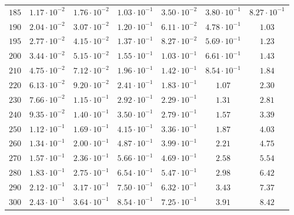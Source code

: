 \begin{table}[h]
\begin{tabular}{lcccccc}
$	185	$ & $	1.17 \cdot 10^{-2} 	$ & $	1.76 \cdot 10^{-2} 	$ & $	1.03 \cdot 10^{-1} 	$ & $	3.50 \cdot 10^{-2} 	$ & $	3.80 \cdot 10^{-1} 	$ & $	8.27 \cdot 10^{-1} 	 $ \\
$	190	$ & $	2.04 \cdot 10^{-2} 	$ & $	3.07 \cdot 10^{-2} 	$ & $	1.20 \cdot 10^{-1} 	$ & $	6.11 \cdot 10^{-2} 	$ & $	4.78 \cdot 10^{-1} 	$ & $	1.03 	 $ \\
$	195	$ & $	2.77 \cdot 10^{-2} 	$ & $	4.15 \cdot 10^{-2} 	$ & $	1.37 \cdot 10^{-1} 	$ & $	8.27 \cdot 10^{-2} 	$ & $	5.69 \cdot 10^{-1} 	$ & $	1.23 	 $ \\
$	200	$ & $	3.44 \cdot 10^{-2} 	$ & $	5.15 \cdot 10^{-2} 	$ & $	1.55 \cdot 10^{-1} 	$ & $	1.03 \cdot 10^{-1} 	$ & $	6.61 \cdot 10^{-1} 	$ & $	1.43 	 $ \\
$	210	$ & $	4.75 \cdot 10^{-2} 	$ & $	7.12 \cdot 10^{-2} 	$ & $	1.96 \cdot 10^{-1} 	$ & $	1.42 \cdot 10^{-1} 	$ & $	8.54 \cdot 10^{-1} 	$ & $	1.84 	 $ \\
$	220	$ & $	6.13 \cdot 10^{-2} 	$ & $	9.20 \cdot 10^{-2} 	$ & $	2.41 \cdot 10^{-1} 	$ & $	1.83 \cdot 10^{-1} 	$ & $	1.07 	$ & $	2.30 	 $ \\
$	230	$ & $	7.66 \cdot 10^{-2} 	$ & $	1.15 \cdot 10^{-1} 	$ & $	2.92 \cdot 10^{-1} 	$ & $	2.29 \cdot 10^{-1} 	$ & $	1.31 	$ & $	2.81 	 $ \\
$	240	$ & $	9.35 \cdot 10^{-2} 	$ & $	1.40 \cdot 10^{-1} 	$ & $	3.50 \cdot 10^{-1} 	$ & $	2.79 \cdot 10^{-1} 	$ & $	1.57 	$ & $	3.39 	 $ \\
$	250	$ & $	1.12 \cdot 10^{-1} 	$ & $	1.69 \cdot 10^{-1} 	$ & $	4.15 \cdot 10^{-1} 	$ & $	3.36 \cdot 10^{-1} 	$ & $	1.87 	$ & $	4.03 	 $ \\
$	260	$ & $	1.34 \cdot 10^{-1} 	$ & $	2.00 \cdot 10^{-1} 	$ & $	4.87 \cdot 10^{-1} 	$ & $	3.99 \cdot 10^{-1} 	$ & $	2.21 	$ & $	4.75 	 $ \\
$	270	$ & $	1.57 \cdot 10^{-1} 	$ & $	2.36 \cdot 10^{-1} 	$ & $	5.66 \cdot 10^{-1} 	$ & $	4.69 \cdot 10^{-1} 	$ & $	2.58 	$ & $	5.54 	 $ \\
$	280	$ & $	1.83 \cdot 10^{-1} 	$ & $	2.75 \cdot 10^{-1} 	$ & $	6.54 \cdot 10^{-1} 	$ & $	5.47 \cdot 10^{-1} 	$ & $	2.98 	$ & $	6.42 	 $ \\
$	290	$ & $	2.12 \cdot 10^{-1} 	$ & $	3.17 \cdot 10^{-1} 	$ & $	7.50 \cdot 10^{-1} 	$ & $	6.32 \cdot 10^{-1} 	$ & $	3.43 	$ & $	7.37 	 $ \\
$	300	$ & $	2.43 \cdot 10^{-1} 	$ & $	3.64 \cdot 10^{-1} 	$ & $	8.54 \cdot 10^{-1} 	$ & $	7.25 \cdot 10^{-1} 	$ & $	3.91 	$ & $	8.42 	 $ \\

\end{tabular}
\end{table}
